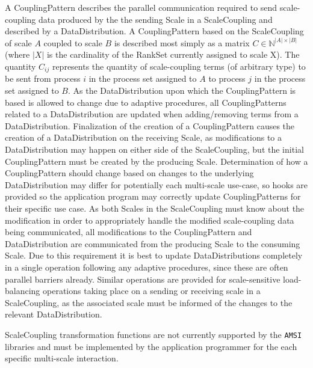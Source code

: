 \documentclass[11pt]{article}
\begin{document}
A CouplingPattern describes the parallel communication required to send scale-coupling data produced by the the sending Scale in a ScaleCoupling and described by a DataDistribution.
A CouplingPattern based on the ScaleCoupling of scale $A$ coupled to scale $B$ is described most simply as a matrix $C \in \mathbb{N}^{|A|\times|B|}$ (where $|X|$ is the cardinality of the RankSet currently assigned to scale X).
The quantity $C_{ij}$ represents the quantity of scale-coupling terms (of arbitrary type) to be sent from process $i$ in the process set assigned to $A$ to process $j$ in the process set assigned to $B$.
As the DataDistribution upon which the CouplingPattern is based is allowed to change due to adaptive procedures, all CouplingPatterns related to a DataDistribution are updated when adding/removing terms from a DataDistribution.
Finalization of the creation of a CouplingPattern causes the creation of a DataDistribution on the receiving Scale, as modifications to a DataDistribution may happen on either side of the ScaleCoupling, but the initial CouplingPattern must be created by the producing Scale.
Determination of how a CouplingPattern should change based on changes to the underlying DataDistribution may differ for potentially each multi-scale use-case, so hooks are provided so the application program may correctly update CouplingPatterns for their specific use case.
As both Scales in the ScaleCoupling must know about the modification in order to appropriately handle the modified scale-coupling data being communicated, all modifications to the CouplingPattern and DataDistribution are communicated from the producing Scale to the consuming Scale.
Due to this requirement it is best to update DataDistributions completely in a single operation following any adaptive procedures, since these are often parallel barriers already.
Similar operations are provided for scale-sensitive load-balancing operations taking place on a sending or receiving scale in a ScaleCoupling, as the associated scale must be informed of the changes to the relevant DataDistribution.

ScaleCoupling transformation functions are not currently supported by the \verb|AMSI| libraries and must be implemented by the application programmer for the each specific multi-scale interaction.
\end{document}
